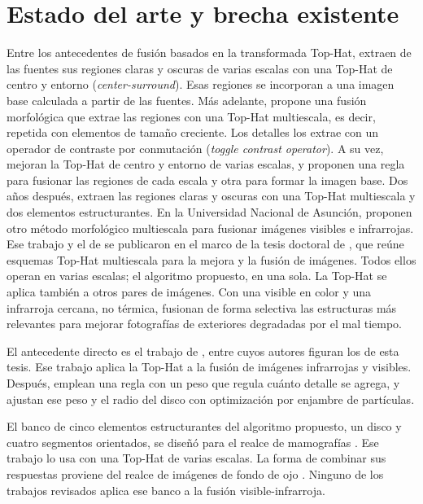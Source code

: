 \section{Estado del arte y brecha existente}
\label{sec:estado-arte}

Entre los antecedentes de fusión basados en la transformada Top-Hat, \textcite{bai2011} extraen de las
fuentes sus regiones claras y oscuras de varias escalas con una Top-Hat de centro y entorno
(\textit{center-surround}). Esas regiones se incorporan a una imagen base calculada a partir de las
fuentes. Más adelante, \textcite{bai2013} propone una fusión morfológica que extrae las regiones con una
Top-Hat multiescala, es decir, repetida con elementos de tamaño creciente. Los detalles los extrae con un
operador de contraste por conmutación (\textit{toggle contrast operator}). A su vez, \textcite{zhu2017}
mejoran la Top-Hat de centro y entorno de varias escalas, y proponen una regla para fusionar las regiones
de cada escala y otra para formar la imagen base. Dos años después, \textcite{saravia2019} extraen
las regiones claras y oscuras con una Top-Hat multiescala y dos elementos estructurantes. En la
Universidad Nacional de Asunción, \textcite{roman2020} proponen otro método morfológico multiescala
para fusionar imágenes visibles e infrarrojas. Ese trabajo y el de \textcite{saravia2019} se publicaron
en el marco de la tesis doctoral de \textcite{melloroman2021}, que reúne esquemas Top-Hat multiescala
para la mejora y la fusión de imágenes. Todos ellos operan en varias escalas; el algoritmo
propuesto, en una sola. La Top-Hat se aplica también a otros pares de imágenes. Con una visible en color
y una infrarroja cercana, no térmica, \textcite{herreraarellano2021} fusionan de forma selectiva las
estructuras más relevantes para mejorar fotografías de exteriores degradadas por el mal tiempo.

El antecedente directo es el trabajo de \textcite{bajacfigueredo2024}, entre cuyos autores figuran los
de esta tesis. Ese trabajo aplica la Top-Hat a la fusión de imágenes infrarrojas y visibles. Después,
\textcite{ortegarodriguez2025} emplean una regla con un peso que regula cuánto detalle se agrega, y
ajustan ese peso y el radio del disco con optimización por enjambre de partículas.

El banco de cinco elementos estructurantes del algoritmo propuesto, un disco y cuatro segmentos
orientados, se diseñó para el realce de mamografías \parencite{floressf}. Ese trabajo lo usa con una
Top-Hat de varias escalas. La forma de combinar sus respuestas proviene del realce de imágenes de fondo
de ojo \parencite{bala2024}. Ninguno de los trabajos revisados aplica ese banco a la fusión
visible-infrarroja.

